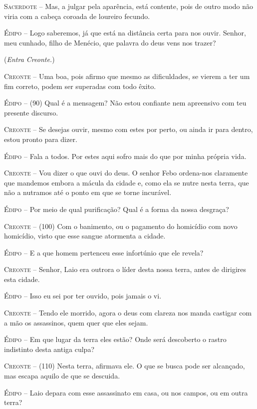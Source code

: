 \textsc{Sacerdote} --   Mas, a julgar pela aparência, está contente, pois de outro modo não
viria com a cabeça coroada de loureiro fecundo.

\textsc{Édipo} --   Logo saberemos, já que está na distância certa para nos ouvir. Senhor,
meu cunhado, filho de Menécio, que palavra do deus vens nos trazer?

(\emph{Entra Creonte.})

\textsc{Creonte} --   Uma boa, pois afirmo que mesmo as dificuldades, se vierem a ter um fim
correto, podem ser superadas com todo êxito.

\textsc{Édipo} --   (90) Qual é a mensagem? Não estou confiante nem apreensivo com teu
presente discurso.

\textsc{Creonte} --   Se desejas ouvir, mesmo com estes por perto, ou ainda ir para dentro,
estou pronto para dizer.

\textsc{Édipo} --   Fala a todos. Por estes aqui sofro mais do que por minha própria vida.

\textsc{Creonte} --   Vou dizer o que ouvi do deus. O senhor Febo ordena-nos claramente que
mandemos embora a mácula da cidade e, como ela se nutre nesta terra, que
não a nutramos até o ponto em que se torne incurável.

\textsc{Édipo} --   Por meio de qual purificação? Qual é a forma da nossa desgraça?

\textsc{Creonte} --   (100) Com o banimento, ou o pagamento do homicídio com novo homicídio,
visto que esse sangue atormenta a cidade.

\textsc{Édipo} --   E a que homem pertenceu esse infortúnio que ele revela?

\textsc{Creonte} --   Senhor, Laio era outrora o líder desta nossa terra, antes de dirigires
esta cidade.

\textsc{Édipo} --   Isso eu sei por ter ouvido, pois jamais o vi.

\textsc{Creonte} --   Tendo ele morrido, agora o deus com clareza nos manda castigar com a mão
os assassinos, quem quer que eles sejam.

\textsc{Édipo} --   Em que lugar da terra eles estão? Onde será descoberto o rastro
indistinto desta antiga culpa?

\textsc{Creonte} --   (110) Nesta terra, afirmava ele. O que se busca pode ser alcançado, mas
escapa aquilo de que se descuida.

\textsc{Édipo} --   Laio depara com esse assassinato em casa, ou nos campos, ou em outra
terra?

